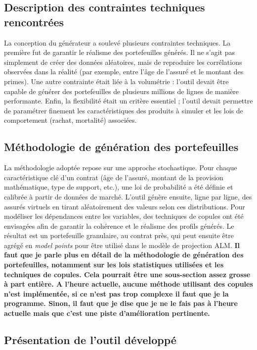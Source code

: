 \subsection{Description des contraintes techniques rencontrées}

La conception du générateur a soulevé plusieurs contraintes techniques. La première fut de garantir le réalisme des portefeuilles générés. Il ne s'agit pas simplement de créer des données aléatoires, mais de reproduire les corrélations observées dans la réalité (par exemple, entre l'âge de l'assuré et le montant des primes). Une autre contrainte était liée à la volumétrie : l'outil devait être capable de générer des portefeuilles de plusieurs millions de lignes de manière performante. Enfin, la flexibilité était un critère essentiel ; l'outil devait permettre de paramétrer finement les caractéristiques des produits à simuler et les lois de comportement (rachat, mortalité) associées.

\subsection{Méthodologie de génération des portefeuilles}

La méthodologie adoptée repose sur une approche stochastique. Pour chaque caractéristique clé d'un contrat (âge de l'assuré, montant de la provision mathématique, type de support, etc.), une loi de probabilité a été définie et calibrée à partir de données de marché. L'outil génère ensuite, ligne par ligne, des assurés virtuels en tirant aléatoirement des valeurs selon ces distributions. Pour modéliser les dépendances entre les variables, des techniques de copules ont été envisagées afin de garantir la cohérence et le réalisme des profils générés. Le résultat est un portefeuille granulaire, au contrat près, qui peut ensuite être agrégé en \textit{model points} pour être utilisé dans le modèle de projection ALM. \textbf{Il faut que je parle plus en détail de la méthodologie de génération des portefeuilles, notamment sur les lois statistiques utilisées et les techniques de copules. Cela pourrait être une sous-section assez grosse à part entière. A l'heure actuelle, aucune méthode utilisant des copules n'est implémentée, si ce n'est pas trop complexe il faut que je la programme. Sinon, il faut que je dise que je ne le fais pas à l'heure actuelle mais que c'est une piste d'amélioration pertinente.}

\subsection{Présentation de l'outil développé}

